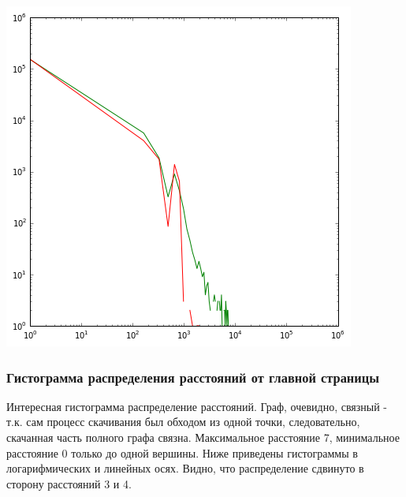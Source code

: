 \documentclass[12pt]{article}
\begin{document}
\includegraphics[scale=0.7]{22.png}

\subsubsection*{Гистограмма распределения расстояний от главной страницы}
Интересная гистограмма распределение расстояний. Граф, очевидно, связный - т.к. сам процесс скачивания был обходом из одной точки, следовательно, скачанная часть полного графа связна. Максимальное расстояние 7, минимальное расстояние 0 только до одной вершины. Ниже приведены гистограммы в логарифмических и линейных осях. Видно, что распределение сдвинуто в сторону расстояний 3 и 4.
\end{document}
